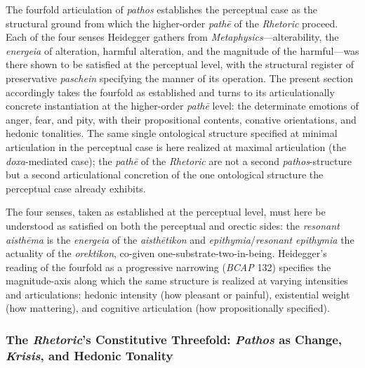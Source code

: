 \documentclass{article}
\begin{document}
The fourfold articulation of \textit{pathos} establishes the perceptual case as the structural ground from which the higher-order \textit{pathē} of the \textit{Rhetoric} proceed. Each of the four senses Heidegger gathers from \textit{Metaphysics}---alterability, the \textit{energeia} of alteration, harmful alteration, and the magnitude of the harmful---was there shown to be satisfied at the perceptual level, with the structural register of preservative \textit{paschein} specifying the manner of its operation. The present section accordingly takes the fourfold as established and turns to its articulationally concrete instantiation at the higher-order \textit{pathē} level: the determinate emotions of anger, fear, and pity, with their propositional contents, conative orientations, and hedonic tonalities. The same single ontological structure specified at minimal articulation in the perceptual case is here realized at maximal articulation (the \textit{doxa}-mediated case); the \textit{pathē} of the \textit{Rhetoric} are not a second \textit{pathos}-structure but a second articulational concretion of the one ontological structure the perceptual case already exhibits.

The four senses, taken as established at the perceptual level, must here be understood as satisfied on both the perceptual and orectic sides: the \textit{resonant aisthēma} is the \textit{energeia} of the \textit{aisthētikon} and \textit{epithymia}/\textit{resonant epithymia} the actuality of the \textit{orektikon}, co-given one-substrate-two-in-being. Heidegger's reading of the fourfold as a progressive narrowing (\textit{BCAP} 132) specifies the magnitude-axis along which the same structure is realized at varying intensities and articulations: hedonic intensity (how pleasant or painful), existential weight (how mattering), and cognitive articulation (how propositionally specified).

\subsubsection{The \textit{Rhetoric}'s Constitutive Threefold: \textit{Pathos} as Change, \textit{Krisis}, and Hedonic Tonality}
\end{document}

